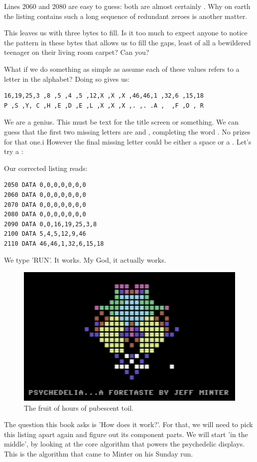 Lines 2060 and 2080 are easy to guess: both are almost certainly . Why on earth the listing contains such
a long sequence of redundant zeroes is another matter. 

This leaves us with three bytes to fill. Is it too much to expect anyone to notice the pattern in these bytes that 
allows us to fill the gaps, least of all a bewildered teenager on their living room carpet? Can you? 


What if we do something as simple as assume each of these values refers to a letter in the alphabet? Doing so gives
us:

\begin{lstlisting}[escapechar=\%]
16,19,25,3 ,8 ,5 ,4 ,5 ,12,X ,X ,X ,46,46,1 ,32,6 ,15,18
P ,S ,Y, C ,H ,E ,D ,E ,L ,X ,X ,X ,. ,. .A ,  ,F ,O , R
\end{lstlisting}

We are a genius. This must be text for the title screen or something. We can guess that the first two missing letters
are  and , completing the word . No prizes for that one.i However the final missing
letter could be either a space or a . Let's try a :

Our corrected listing reads:
\clearpage
\lstset{style=C64BasicStyle}
\begin{lstlisting}[escapechar=\%]
2050 DATA 0,0,0,0,0,0,0 
2060 DATA 0,0,0,0,0,0,0
2070 DATA 0,0,0,0,0,0,0 
2080 DATA 0,0,0,0,0,0,0
2090 DATA 0,0,16,19,25,3,8 
2100 DATA 5,4,5,12,9,46
2110 DATA 46,46,1,32,6,15,18
\end{lstlisting}

We type 'RUN'. It works. My God, it actually works. 
\begin{figure}[H]
    \centering
    \begin{adjustbox}{width=12cm,center}
      \includegraphics[width=12cm]{src/listing/itworks.png}%
    \end{adjustbox}
  \caption{The fruit of hours of pubescent toil.}
\end{figure}

The question this book asks is 'How does it work?'. For that, we will
need to pick this listing apart again and figure out its component parts. We will start 'in the middle', by looking at the
core algorithm that powers the psychedelic displays. This is the algorithm that came to Minter on his Sunday run.

